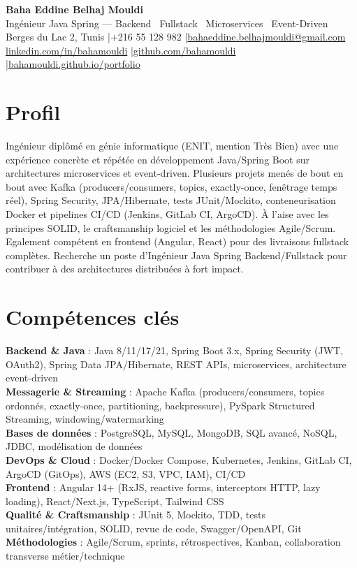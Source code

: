 \documentclass[a4paper,10pt]{article}
\begin{document}
\begin{center}
{\LARGE\bfseries\color{navy} Baha Eddine Belhaj Mouldi}\\[3pt]
{\large Ingénieur Java Spring --- Backend \textbar\ Fullstack \textbar\ Microservices \textbar\ Event-Driven}\\[4pt]
Berges du Lac 2, Tunis \quad|\quad +216 55 128 982 \quad|\quad \href{mailto:bahaeddine.belhajmouldi@gmail.com}{bahaeddine.belhajmouldi@gmail.com}\\[1pt]
\href{https://www.linkedin.com/in/bahamouldi}{linkedin.com/in/bahamouldi} \quad|\quad \href{https://github.com/bahamouldi}{github.com/bahamouldi} \quad|\quad \href{https://bahamouldi.github.io/portfolio/}{bahamouldi.github.io/portfolio}
\end{center}
\vspace{2pt}
\section{Profil}
Ingénieur diplômé en génie informatique (ENIT, mention Très Bien) avec une expérience concrète et répétée en développement Java/Spring Boot sur architectures microservices et event-driven. Plusieurs projets menés de bout en bout avec Kafka (producers/consumers, topics, exactly-once, fenêtrage temps réel), Spring Security, JPA/Hibernate, tests JUnit/Mockito, conteneurisation Docker et pipelines CI/CD (Jenkins, GitLab CI, ArgoCD). À l'aise avec les principes SOLID, le craftsmanship logiciel et les méthodologies Agile/Scrum. Egalement compétent en frontend (Angular, React) pour des livraisons fullstack complètes. Recherche un poste d'Ingénieur Java Spring Backend/Fullstack pour contribuer à des architectures distribuées à fort impact.
\section{Compétences clés}
\textbf{Backend \& Java} : Java 8/11/17/21, Spring Boot 3.x, Spring Security (JWT, OAuth2), Spring Data JPA/Hibernate, REST APIs, microservices, architecture event-driven\\[0.5pt]
\textbf{Messagerie \& Streaming} : Apache Kafka (producers/consumers, topics ordonnés, exactly-once, partitioning, backpressure), PySpark Structured Streaming, windowing/watermarking\\[0.5pt]
\textbf{Bases de données} : PostgreSQL, MySQL, MongoDB, SQL avancé, NoSQL, JDBC, modélisation de données\\[0.5pt]
\textbf{DevOps \& Cloud} : Docker/Docker Compose, Kubernetes, Jenkins, GitLab CI, ArgoCD (GitOps), AWS (EC2, S3, VPC, IAM), CI/CD\\[0.5pt]
\textbf{Frontend} : Angular 14+ (RxJS, reactive forms, interceptors HTTP, lazy loading), React/Next.js, TypeScript, Tailwind CSS\\[0.5pt]
\textbf{Qualité \& Craftsmanship} : JUnit 5, Mockito, TDD, tests unitaires/intégration, SOLID, revue de code, Swagger/OpenAPI, Git\\[0.5pt]
\textbf{Méthodologies} : Agile/Scrum, sprints, rétrospectives, Kanban, collaboration transverse métier/technique
\end{document}
